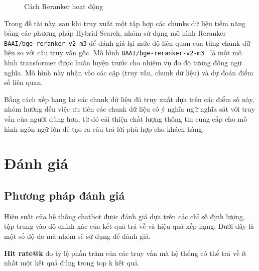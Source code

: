 \documentclass{article}
\numberwithin{equation}{section}
\numberwithin{equation}{section}
\begin{document}
\begin{figure}[!ht]
    \centering
    \caption{Cách Reranker hoạt động}
    \label{fig:reranker}
\end{figure}

Trong đề tài này, sau khi truy xuất một tập hợp các chunks dữ liệu tiềm năng bằng các phương pháp Hybrid Search, nhóm sử dụng mô hình Reranker \texttt{BAAI/bge-reranker-v2-m3} để đánh giá lại mức độ liên quan của từng chunk dữ liệu so với câu truy vấn gốc. Mô hình \texttt{BAAI/bge-reranker-v2-m3}~\cite{FlagOpen2023} là một mô hình transformer được huấn luyện trước cho nhiệm vụ đo độ tương đồng ngữ nghĩa. Mô hình này nhận vào các cặp (truy vấn, chunk dữ liệu) và dự đoán điểm số liên quan. 

Bằng cách xếp hạng lại các chunk dữ liệu đã truy xuất dựa trên các điểm số này, nhóm hướng đến việc ưu tiên các chunk dữ liệu có ý nghĩa ngữ nghĩa sát với truy vấn của người dùng hơn, từ đó cải thiện chất lượng thông tin cung cấp cho mô hình ngôn ngữ lớn để tạo ra câu trả lời phù hợp cho khách hàng.

\section{\textbf{Đánh giá}}
\subsection{Phương pháp đánh giá}
Hiệu suất của hệ thông chatbot được đánh giá dựa trên các chỉ số định lượng, tập trung vào độ chính xác của kết quả trả về và hiệu quả xếp hạng. Dưới đây là một số độ đo mà nhóm sẽ sử dụng để đánh giá.

\textbf{Hit rate@k} đo tỷ lệ phần trăm của các truy vấn mà hệ thống có thể trả về ít nhất một kết quả đúng trong top k kết quả.
\end{document}

